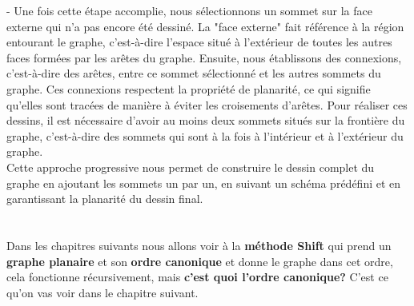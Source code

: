 \documentclass[hidelinks,letterpaper,12pt]{article}
\begin{document}
\begin{figure}[H]
\centering		
{}	
\label{Graphe $G_{i}$}	
\end{figure}
{\color{white}-}		
Une fois cette étape accomplie, nous sélectionnons un sommet sur la face externe qui n'a pas encore été dessiné. La "face externe" fait référence à la région entourant le graphe, c'est-à-dire l'espace situé à l'extérieur de toutes les autres faces formées par les arêtes du graphe. Ensuite, nous établissons des connexions, c'est-à-dire des arêtes, entre ce sommet sélectionné et les autres sommets du graphe. Ces connexions respectent la propriété de planarité, ce qui signifie qu'elles sont tracées de manière à éviter les croisements d'arêtes. Pour réaliser ces dessins, il est nécessaire d'avoir au moins deux sommets situés sur la frontière du graphe, c'est-à-dire des sommets qui sont à la fois à l'intérieur et à l'extérieur du graphe.
\\ 
Cette approche progressive nous permet de construire le dessin complet du graphe en ajoutant les sommets un par un, en suivant un schéma prédéfini et en garantissant la planarité du dessin final.
\\ \\ \\ 
Dans les chapitres suivants nous allons voir à la\textbf{ méthode Shift} qui prend un \textbf{graphe planaire} et son \textbf{ordre canonique} et donne le graphe dans cet ordre, cela fonctionne récursivement, mais \textbf{c'est quoi l'ordre canonique?} 
C'est ce qu'on vas voir dans le chapitre suivant.
\end{document}
